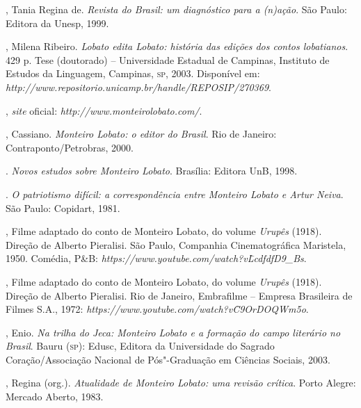 \begin{bibliohedra}
, Tania Regina de. \emph{Revista do Brasil: um diagnóstico para a
(n)ação}. São Paulo: Editora da Unesp, 1999.

, Milena Ribeiro. \emph{Lobato edita Lobato: história das edições
dos contos lobatianos}. 429 p. Tese (doutorado) -- Universidade Estadual
de Campinas, Instituto de Estudos da Linguagem, Campinas, \textsc{sp}, 2003.
Disponível em: \emph{http://www.repositorio.unicamp.br/handle/REPOSIP/270369}.

, \emph{site} oficial:
\emph{http://www.monteirolobato.com/}.

, Cassiano. \emph{Monteiro Lobato: o editor do Brasil}. Rio de
Janeiro: Contraponto/Petrobras, 2000.

\titidem. \emph{Novos estudos sobre Monteiro Lobato}. Brasília:
Editora UnB, 1998.

\titidem. \emph{O patriotismo difícil: a correspondência entre
Monteiro Lobato e Artur Neiva}. São Paulo: Copidart, 1981.

, Filme adaptado do conto de Monteiro
Lobato, do volume \emph{Urupês} (1918). Direção de Alberto Pieralisi.
São Paulo, Companhia Cinematográfica Maristela, 1950. Comédia, P\&B:
\emph{https://www.youtube.com/watch?v\=LcdfdfD9\_Bs}.

, Filme adaptado do conto de Monteiro
Lobato, do volume \emph{Urupês} (1918). Direção de Alberto Pieralisi.
Rio de Janeiro, Embrafilme -- Empresa Brasileira de Filmes S.A., 1972:
\emph{https://www.youtube.com/watch?v\=C9OrDOQWm5o}.

, Enio. \emph{Na trilha do Jeca: Monteiro Lobato e a formação do
campo literário no Brasil}. Bauru (\textsc{sp}): Edusc, Editora da Universidade
do Sagrado Coração/Associação Nacional de Pós"-Graduação em Ciências
Sociais, 2003.

, Regina (org.). \emph{Atualidade de Monteiro Lobato: uma
revisão crítica}. Porto Alegre: Mercado Aberto, 1983.
\end{bibliohedra}